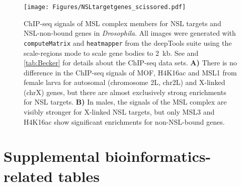 
%

%
\begin{figure}[tb]
	\begin{minipage}[c]{0.50\textwidth}
		\texttt{[image: Figures/NSLtargetgenes\_scissored.pdf]}
	\end{minipage} \hfill
	\begin{minipage}[c]{0.4\textwidth}
		\begin{footnotesize}
			\caption[ChIP-seq signals of MSL complex members for NSL targets and NSL-non-bound genes in \textit{Drosophila}.]{\textsf{ChIP-seq signals of MSL complex members for NSL targets and NSL-non-bound genes in \textit{Drosophila}. All images were generated with \texttt{computeMatrix} and \texttt{heatmapper} from the deepTools suite \citep{Ramirez2014} using the scale-regions mode to scale gene bodies to 2~kb. See  and \ref{tab:Becker} for details about the ChIP-seq data sets.
\textbf{A)} There is no difference in the ChIP-seq signals of MOF, H4K16ac and MSL1 from female larva for autosomal (chromosome 2L, chr2L) and X-linked (chrX) genes, but there are almost exclusively strong enrichments for NSL targets.
\textbf{B)} In males, the signals of the MSL complex are visibly stronger for X-linked NSL targets, but only MSL3 and H4K16ac show significant enrichments for non-NSL-bound genes.}}
			\label{fig:NSLtargetgenes}
		\end{footnotesize}
	\end{minipage}
\end{figure}

\clearpage


%
%
%
\section{Supplemental bioinformatics-related tables}
%



%
